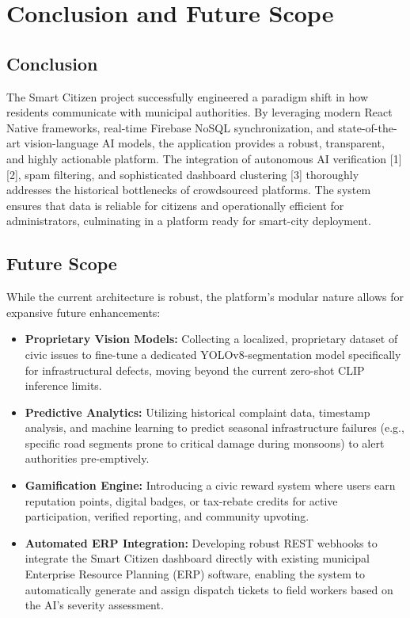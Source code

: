 \documentclass[12pt,a4paper]{report}
\begin{document}
\chapter{Conclusion and Future Scope}
\section{Conclusion}
The Smart Citizen project successfully engineered a paradigm shift in how residents communicate with municipal authorities. By leveraging modern React Native frameworks, real-time Firebase NoSQL synchronization, and state-of-the-art vision-language AI models, the application provides a robust, transparent, and highly actionable platform. The integration of autonomous AI verification [1][2], spam filtering, and sophisticated dashboard clustering [3] thoroughly addresses the historical bottlenecks of crowdsourced platforms. The system ensures that data is reliable for citizens and operationally efficient for administrators, culminating in a platform ready for smart-city deployment.

\section{Future Scope}
While the current architecture is robust, the platform's modular nature allows for expansive future enhancements:
\begin{itemize}
    \item \textbf{Proprietary Vision Models:} Collecting a localized, proprietary dataset of civic issues to fine-tune a dedicated YOLOv8-segmentation model specifically for infrastructural defects, moving beyond the current zero-shot CLIP inference limits.
    \item \textbf{Predictive Analytics:} Utilizing historical complaint data, timestamp analysis, and machine learning to predict seasonal infrastructure failures (e.g., specific road segments prone to critical damage during monsoons) to alert authorities pre-emptively.
    \item \textbf{Gamification Engine:} Introducing a civic reward system where users earn reputation points, digital badges, or tax-rebate credits for active participation, verified reporting, and community upvoting.
    \item \textbf{Automated ERP Integration:} Developing robust REST webhooks to integrate the Smart Citizen dashboard directly with existing municipal Enterprise Resource Planning (ERP) software, enabling the system to automatically generate and assign dispatch tickets to field workers based on the AI's severity assessment.
\end{itemize}
\end{document}
